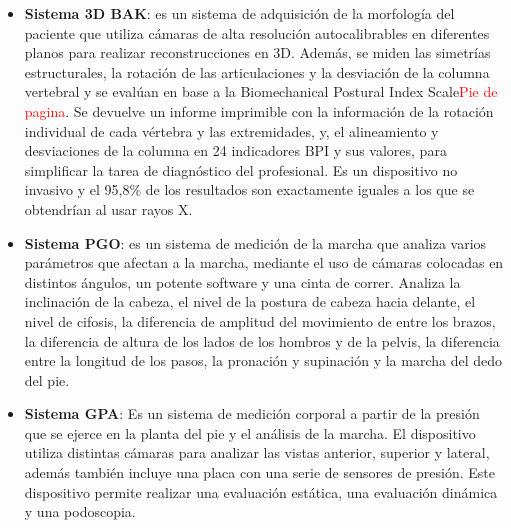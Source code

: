 \begin{itemize}
    \item \textbf{Sistema 3D BAK}\cite{3DBAK}: es un sistema de adquisición de la morfología del paciente que utiliza cámaras de alta resolución autocalibrables en diferentes planos para realizar reconstrucciones en 3D. Además, se miden las simetrías estructurales, la rotación de las articulaciones y la desviación de la columna vertebral y se evalúan en base a la Biomechanical Postural Index Scale\textcolor{red}{Pie de pagina}. Se devuelve un informe imprimible con la información de la rotación individual de cada vértebra y las extremidades, y, el alineamiento y desviaciones de la columna en 24 indicadores BPI y sus valores, para simplificar la tarea de diagnóstico del profesional. Es un dispositivo no invasivo y el 95,8\% de los resultados son exactamente iguales a los que se obtendrían al usar rayos X. 

    \item \textbf{Sistema PGO}\cite{SisPGO}: es un sistema de medición de la marcha que analiza varios parámetros que afectan a la marcha, mediante el uso de cámaras colocadas en distintos ángulos, un potente software y una cinta de correr. Analiza la inclinación de la cabeza, el nivel de la postura de cabeza hacia delante, el nivel de cifosis, la diferencia de amplitud del movimiento de entre los brazos, la diferencia de altura de los lados de los hombros y de la pelvis, la diferencia entre la longitud de los pasos, la pronación y supinación y la marcha del dedo del pie. 

    \item \textbf{Sistema GPA}\cite{SisGPA}: Es un sistema de medición corporal a partir de la presión que se ejerce en la planta del pie y el análisis de la marcha. El dispositivo utiliza distintas cámaras para analizar las vistas anterior, superior y lateral, además también incluye una placa con una serie de sensores de presión. Este dispositivo permite realizar una evaluación estática, una evaluación dinámica y una podoscopia.  
\end{itemize}

